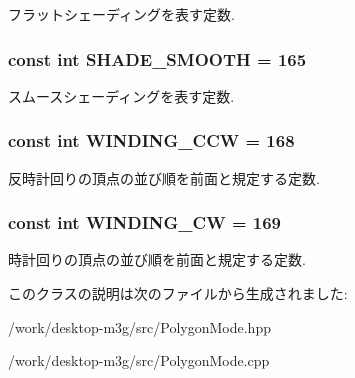 フラットシェーディングを表す定数. \hypertarget{classm3g_1_1PolygonMode_2da5e6696c8e910d9fca74b583a081df}{
\subsubsection[{SHADE\_\-SMOOTH}]{\setlength{\rightskip}{0pt plus 5cm}const int {\bf SHADE\_\-SMOOTH} = 165}}
\label{classm3g_1_1PolygonMode_2da5e6696c8e910d9fca74b583a081df}


スムースシェーディングを表す定数. \hypertarget{classm3g_1_1PolygonMode_98d881cf813edf483860268535014210}{
\subsubsection[{WINDING\_\-CCW}]{\setlength{\rightskip}{0pt plus 5cm}const int {\bf WINDING\_\-CCW} = 168}}
\label{classm3g_1_1PolygonMode_98d881cf813edf483860268535014210}


反時計回りの頂点の並び順を前面と規定する定数. \hypertarget{classm3g_1_1PolygonMode_86975b3dec0d6cc20f54fd82eb13ef9e}{
\subsubsection[{WINDING\_\-CW}]{\setlength{\rightskip}{0pt plus 5cm}const int {\bf WINDING\_\-CW} = 169}}
\label{classm3g_1_1PolygonMode_86975b3dec0d6cc20f54fd82eb13ef9e}


時計回りの頂点の並び順を前面と規定する定数. 

このクラスの説明は次のファイルから生成されました:\begin{CompactItemize}
\item 
/work/desktop-m3g/src/PolygonMode.hpp\item 
/work/desktop-m3g/src/PolygonMode.cpp\end{CompactItemize}
